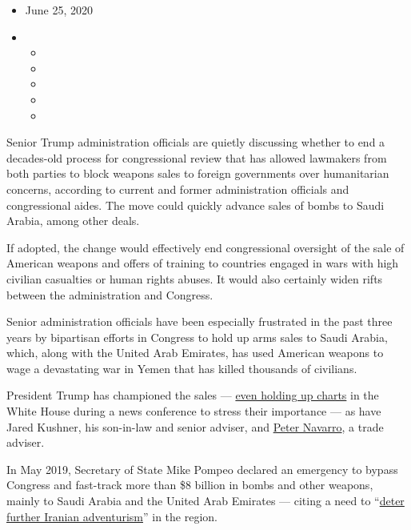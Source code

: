 \begin{itemize}
\item
  June 25, 2020
\item
  \begin{itemize}
  \item
  \item
  \item
  \item
  \item
  \end{itemize}
\end{itemize}

Senior Trump administration officials are quietly discussing whether to
end a decades-old process for congressional review that has allowed
lawmakers from both parties to block weapons sales to foreign
governments over humanitarian concerns, according to current and former
administration officials and congressional aides. The move could quickly
advance sales of bombs to Saudi Arabia, among other deals.

If adopted, the change would effectively end congressional oversight of
the sale of American weapons and offers of training to countries engaged
in wars with high civilian casualties or human rights abuses. It would
also certainly widen rifts between the administration and Congress.

Senior administration officials have been especially frustrated in the
past three years by bipartisan efforts in Congress to hold up arms sales
to Saudi Arabia, which, along with the United Arab Emirates, has used
American weapons to wage a devastating war in Yemen that has killed
thousands of civilians.

President Trump has championed the sales ---
\href{https://www.washingtonpost.com/business/2018/11/21/trump-again-uses-arms-sales-justify-saudi-ties-dragging-us-defense-contractors-into-an-unwelcome-debate/}{even
holding up charts} in the White House during a news conference to stress
their importance --- as have Jared Kushner, his son-in-law and senior
adviser, and
\href{https://www.nytimes.com/2020/05/16/us/arms-deals-raytheon-yemen.html}{Peter
Navarro}, a trade adviser.

In May 2019, Secretary of State Mike Pompeo declared an emergency to
bypass Congress and fast-track more than \$8 billion in bombs and other
weapons, mainly to Saudi Arabia and the United Arab Emirates --- citing
a need to
``\href{https://apnews.com/4a1fef7a381045a783b27479f191809d}{deter
further Iranian adventurism}'' in the region.

